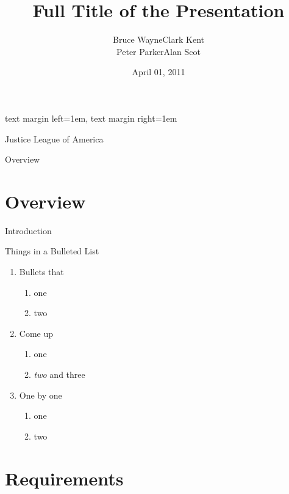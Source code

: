 \usepackage[english] {babel}
\usepackage[T1]      {fontenc}
\usepackage{amsmath, amsfonts, graphicx}
\usepackage{bibunits, tikz}
\setbeamersize
  {text margin left=1em, text margin right=1em}
\title
  [Short Title]
  {Full Title of the Presentation}
\author
  [Bruce Wayne]
  {Bruce Wayne\quad Clark Kent\\Peter Parker\quad Alan Scot}
\date
  {April 01, 2011}
\institute
  {Justice League of America}


\maketitle

\begin{frame}{Overview}

  \tableofcontents

\end{frame}

\section%
  {Overview}

\begin{frame}
  {Introduction}

  Things in a Bulleted List\pause

  \begin{enumerate}
  \item Bullets that
    \begin{enumerate}
    \item one
    \item two
    \end{enumerate}\pause
  \item Come up
    \begin{enumerate}
    \item one
    \item \emph{two} and three
    \end{enumerate}\pause
  \item One by one
    \begin{enumerate}
    \item one
    \item two
    \end{enumerate}
  \end{enumerate}
\end{frame}

\section%
  {Requirements}

